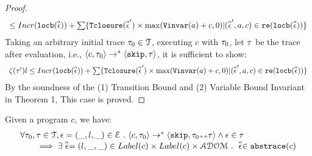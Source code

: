 \begin{proof}
\[\begin{array}{l}
\leq 
Incr(\locbound(\absevent)) + 
\sum\{\absclr(\absevent') \times \max(\varinvar(a) + c, 0) | (\absevent', a, c) \in \reset(\locbound(\absevent))\} 
\end{array}
\]
  Taking an arbitrary initial trace
  $\trace_0 \in \mathcal{T}$, 
  executing $c$ with $\trace_0$, let $\trace$ be the trace after evaluation, i.e., $\config{{c}, \trace_0} \to^{*} \config{\eskip,\vtrace}$, it is sufficient to show:
  \[ 
    \begin{array}{l}
      \vcounter(\vtrace') l \leq 
    Incr(\locbound(\absevent)) + 
    \sum\{\absclr(\absevent') \times \max(\varinvar(a) + c, 0) | (\absevent', a, c) \in \reset(\locbound(\absevent))\}
  \end{array}
  \]
%
 By the soundness of the (1) Transition Bound and (2) Variable Bound Invariant 
 in \cite{sinn2017complexity} Theorem 1, 
This case is proved.
\end{proof}
%
\begin{lem}
  \label{lem:abscfg_sound}
Given a program ${c}$, we have:
%
\[
  \begin{array}{l}
    \forall \vtrace_0, \trace \in \mathcal{T} ,  \event = (\_, l, \_) \in \eventset \st
\config{{c}, \trace_0} \to^{*} \config{\eskip, \trace_0 \tracecat \vtrace} 
\land \event \in \trace 
\\
\qquad \implies \exists \absevent = (l, \_, \_) \in Label(c) \times Label(c) \times \absdom \st 
\absevent \in \absflow(c)
\end{array}
\]
\end{lem}
